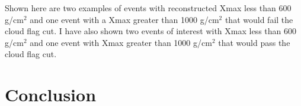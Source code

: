 Shown here are two examples of events with reconstructed Xmax less than 600 g/cm$^{2}$ and one event with a Xmax greater than 1000 g/cm$^{2}$ that would fail the cloud flag cut. I have also shown two events of interest with Xmax less than 600 g/cm$^{2}$ and one event with Xmax greater than 1000 g/cm$^{2}$ that would pass the cloud flag cut.





%
%
%





\section{Conclusion}
